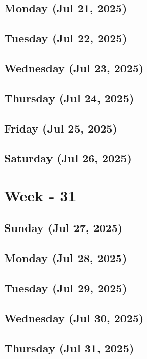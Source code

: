 \subsection*{Monday (Jul 21, 2025)}
\subsection*{Tuesday (Jul 22, 2025)}
\subsection*{Wednesday (Jul 23, 2025)}
\subsection*{Thursday (Jul 24, 2025)}
\subsection*{Friday (Jul 25, 2025)}
\subsection*{Saturday (Jul 26, 2025)}

\section{Week - 31}
\subsection*{Sunday (Jul 27, 2025)}
\subsection*{Monday (Jul 28, 2025)}
\subsection*{Tuesday (Jul 29, 2025)}
\subsection*{Wednesday (Jul 30, 2025)}
\subsection*{Thursday (Jul 31, 2025)}




\newpage
\begin{spacing}{1.0}
\renewcommand{\bibname}{\bf{References}}


\end{spacing}